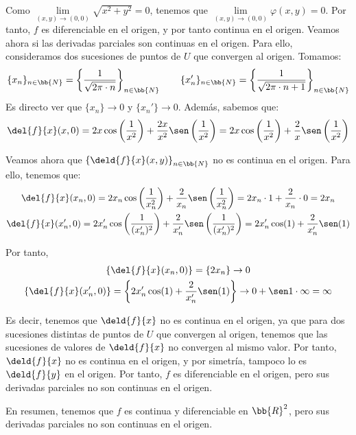 \begin{ejercicio}
    Como $\lim\limits_{(x,y)\to (0,0)} \sqrt{x^2+y^2} = 0$, tenemos que $\lim\limits_{(x,y)\to (0,0)} \varphi(x,y) = 0$. Por tanto, $f$ es diferenciable en el origen, y por tanto continua en el origen.
    Veamos ahora si las derivadas parciales son continuas en el origen. Para ello, consideramos dos sucesiones de puntos de $U$ que convergen al origen. Tomamos:
    \begin{equation*}
        \{x_n\}_{n\in \bb{N}} = \left\{\frac{1}{\sqrt{2\pi\cdot n}}\right\}_{n\in \bb{N}} \qquad \{x_n'\}_{n\in \bb{N}} = \left\{\frac{1}{\sqrt{2\pi\cdot n + 1}}\right\}_{n\in \bb{N}}
    \end{equation*}
    Es directo ver que $\{x_n\}\to 0$ y $\{x_n'\}\to 0$. Además, sabemos que:
    \begin{equation*}
        \del{f}{x}(x,0) = 2x\cos\left(\frac{1}{x^2}\right) + \frac{2x}{x^2}\sen\left(\frac{1}{x^2}\right) = 2x\cos\left(\frac{1}{x^2}\right) + \frac{2}{x}\sen\left(\frac{1}{x^2}\right)
    \end{equation*}
    
    Veamos ahora que $\left\{\deld{f}{x}(x,y)\right\}_{n\in \bb{N}}$ no es continua en el origen. Para ello, tenemos que:
    \begin{gather*}
        \del{f}{x}(x_n,0) = 2x_n\cos\left(\frac{1}{x_n^2}\right) + \frac{2}{x_n}\sen\left(\frac{1}{x_n^2}\right)
        = 2x_n\cdot 1 + \frac{2}{x_n}\cdot 0 = 2x_n \\
        \del{f}{x}(x_n',0) = 2x_n'\cos\left(\frac{1}{(x_n')^2}\right) + \frac{2}{x_n'}\sen\left(\frac{1}{(x_n')^2}\right)
        = 2x_n' \cos(1) + \frac{2}{x_n'}\sen(1)
    \end{gather*}

    Por tanto,
    \begin{gather*}
        \left\{\del{f}{x}(x_n,0)\right\} =  \left\{2x_n\right\} \to 0 \\
        \left\{\del{f}{x}(x_n',0)\right\} = \left\{2x_n' \cos(1) + \frac{2}{x_n'}\sen(1)\right\} \to 0 + \sen 1 \cdot \infty = \infty
    \end{gather*}

    Es decir, tenemos que $\deld{f}{x}$ no es continua en el origen, ya que para dos sucesiones distintas de puntos de $U$ que convergen al origen,
    tenemos que las sucesiones de valores de $\deld{f}{x}$ no convergen al mismo valor. Por tanto, $\deld{f}{x}$ no es continua en el origen, y por simetría, tampoco lo es $\deld{f}{y}$ en el origen.
    Por tanto, $f$ es diferenciable en el origen, pero sus derivadas parciales no son continuas en el origen.

    En resumen, tenemos que $f$ es continua y diferenciable en $\bb{R}^2$, pero sus derivadas parciales no son continuas en el origen.
\end{ejercicio}



